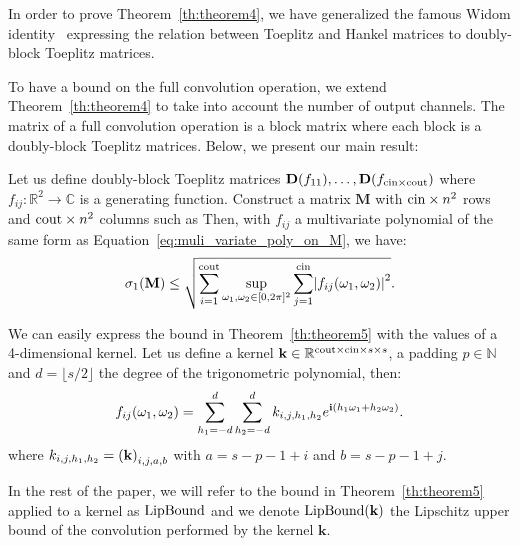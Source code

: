 In order to prove Theorem~\ref{th:theorem4}, we have generalized the famous Widom identity~\cite{widom1976asymptotic}  expressing the relation between Toeplitz and Hankel matrices to doubly-block Toeplitz matrices. 

To have a bound on the full convolution operation, we extend Theorem~\ref{th:theorem4} to take into account the number of output channels.
The matrix of a full convolution operation is a block matrix where each block is a doubly-block Toeplitz matrices. Below, we present our main result:

\begin{theorem} \label{th:theorem5} 
Let us define doubly-block Toeplitz matrices $\mathbf{D}(f_{11}), \dots, \mathbf{D}(f_{\mathrm{cin}\times \mathrm{cout}})$ where $f_{ij}: \mathbb{R}^2 \rightarrow \mathbb{C}$ is a generating function. Construct a matrix $\mathbf{M}$ with $\mathrm{cin}\times n^2$ rows and $\mathrm{cout}\times n^2$ columns such as
Then, with $f_{ij}$ a multivariate polynomial of the same form as Equation~\ref{eq:muli_variate_poly_on_M}, we have:
\begin{equation} \label{eq:lipbound_sv}
 \sigma_1 \left( \mathbf{M} \right) \leq \sqrt{ \sum_{i=1}^{\cout} \sup_{\omega_1, \omega_2 \in [0, 2\pi]^2} \sum_{j = 1}^{\cin} \left|f_{ij}(\omega_1, \omega_2) \right|^2 } .
\end{equation} 
\end{theorem}

We can easily express the bound in Theorem~\ref{th:theorem5} with the values of a 4-dimensional kernel.
Let us define a kernel $\mathbf{k} \in \mathbb{R}^{\mathrm{cout} \times \mathrm{cin} \times s \times s}$, a padding $p \in \mathbb{N}$ and $d = \lfloor s / 2 \rfloor$ the degree of the trigonometric polynomial, then:
\begin{equation}
  f_{ij}(\omega_1, \omega_2) = \sum_{h_1 = -d}^d \sum_{h_2 = -d}^d k_{i, j, h_1,h_2} e^{\mathbf{i} (h_1 \omega_1 + h_2 \omega_2)}.
\end{equation}
where $k_{i, j, h_1,h_2} = \leftmat \mathbf{k} \rightmat_{i, j, a, b}$ with $a =  s - p - 1 + i$ and $b =  s - p - 1 + j$.

In the rest of the paper, we will refer to the bound in Theorem~\ref{th:theorem5} applied to a kernel as $\operatorname{LipBound}$ and we denote $\operatorname{LipBound}(\mathbf{k})$ the Lipschitz upper bound of the convolution performed by the kernel $\mathbf{k}$. 


